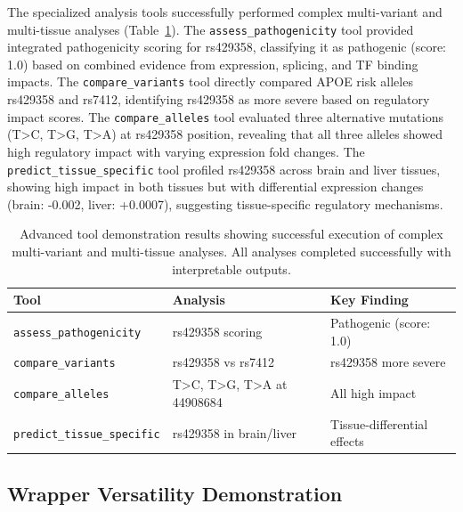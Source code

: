 \documentclass[11pt]{article}
\begin{document}
The specialized analysis tools successfully performed complex multi-variant and multi-tissue analyses (Table~\ref{tab:advanced}). The \texttt{assess\_pathogenicity} tool provided integrated pathogenicity scoring for rs429358, classifying it as pathogenic (score: 1.0) based on combined evidence from expression, splicing, and TF binding impacts. The \texttt{compare\_variants} tool directly compared APOE risk alleles rs429358 and rs7412, identifying rs429358 as more severe based on regulatory impact scores. The \texttt{compare\_alleles} tool evaluated three alternative mutations (T>C, T>G, T>A) at rs429358 position, revealing that all three alleles showed high regulatory impact with varying expression fold changes. The \texttt{predict\_tissue\_specific} tool profiled rs429358 across brain and liver tissues, showing high impact in both tissues but with differential expression changes (brain: -0.002, liver: +0.0007), suggesting tissue-specific regulatory mechanisms.

\begin{table}[h]
\centering
\small
\begin{tabular}{lll}
\toprule
\textbf{Tool} & \textbf{Analysis} & \textbf{Key Finding} \\
\midrule
\texttt{assess\_pathogenicity} & rs429358 scoring & Pathogenic (score: 1.0) \\
\texttt{compare\_variants} & rs429358 vs rs7412 & rs429358 more severe \\
\texttt{compare\_alleles} & T>C, T>G, T>A at 44908684 & All high impact \\
\texttt{predict\_tissue\_specific} & rs429358 in brain/liver & Tissue-differential effects \\
\bottomrule
\end{tabular}
\caption{Advanced tool demonstration results showing successful execution of complex multi-variant and multi-tissue analyses. All analyses completed successfully with interpretable outputs.}
\label{tab:advanced}
\end{table}

\subsection{Wrapper Versatility Demonstration}
\end{document}
